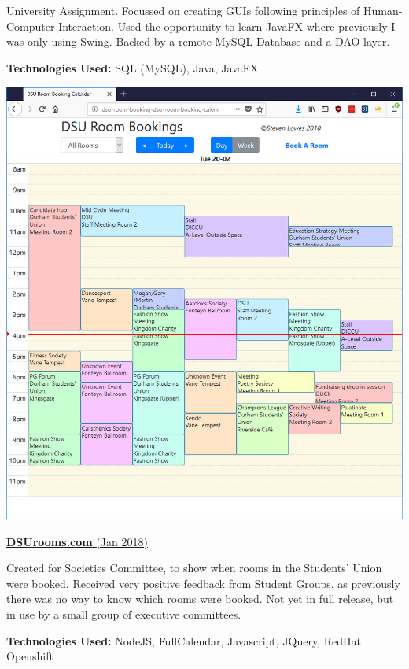 \documentclass[hidelinks, 12pt, a4paper]{article}
\begin{document}
\begin{minipage}{0.40\textwidth}
		University Assignment. Focussed on creating GUIs following principles of Human-Computer Interaction. Used the opportunity to learn JavaFX where previously I was only using Swing. Backed by a remote MySQL Database and a DAO layer.
		
		\textbf{Technologies Used:} SQL (MySQL), Java, JavaFX
		
	\end{minipage}
	\hspace{0.06\textwidth}
	\begin{minipage}{0.40\textwidth}
		
		\begin{center}
			\href{http://www.dsurooms.com}{\includegraphics[width=0.9\linewidth]{dsurooms.png}}
		\end{center}
		\vspace{-12pt}
		\href{http://www.dsurooms.com}{\textbf{DSUrooms.com} (Jan 2018)}
		
		Created for Societies Committee, to show when rooms in the Students' Union were booked. Received very positive feedback from Student Groups, as previously there was no way to know which rooms were booked. Not yet in full release, but in use by a small group of executive committees.
		
		\textbf{Technologies Used:} NodeJS, FullCalendar, Javascript, JQuery, RedHat Openshift
		

\end{minipage}
\end{document}
